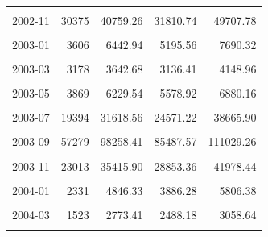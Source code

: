\begin{longtable}[t]{crrrr}
\cellcolor{gray!10}{2002-10} & \cellcolor{gray!10}{46764} & \cellcolor{gray!10}{61256.75} & \cellcolor{gray!10}{58609.47} & \cellcolor{gray!10}{63904.02}\\
2002-11 & 30375 & 40759.26 & 31810.74 & 49707.78\\
\cellcolor{gray!10}{2002-12} & \cellcolor{gray!10}{11649} & \cellcolor{gray!10}{19904.08} & \cellcolor{gray!10}{16540.56} & \cellcolor{gray!10}{23267.60}\\
2003-01 & 3606 & 6442.94 & 5195.56 & 7690.32\\
\cellcolor{gray!10}{2003-02} & \cellcolor{gray!10}{2361} & \cellcolor{gray!10}{3116.51} & \cellcolor{gray!10}{1789.43} & \cellcolor{gray!10}{4443.59}\\
2003-03 & 3178 & 3642.68 & 3136.41 & 4148.96\\
\cellcolor{gray!10}{2003-04} & \cellcolor{gray!10}{1900} & \cellcolor{gray!10}{3649.29} & \cellcolor{gray!10}{3033.63} & \cellcolor{gray!10}{4264.96}\\
2003-05 & 3869 & 6229.54 & 5578.92 & 6880.16\\
\cellcolor{gray!10}{2003-06} & \cellcolor{gray!10}{10549} & \cellcolor{gray!10}{15769.04} & \cellcolor{gray!10}{12007.02} & \cellcolor{gray!10}{19531.06}\\
2003-07 & 19394 & 31618.56 & 24571.22 & 38665.90\\
\cellcolor{gray!10}{2003-08} & \cellcolor{gray!10}{27705} & \cellcolor{gray!10}{71525.80} & \cellcolor{gray!10}{49950.55} & \cellcolor{gray!10}{93101.04}\\
2003-09 & 57279 & 98258.41 & 85487.57 & 111029.26\\
\cellcolor{gray!10}{2003-10} & \cellcolor{gray!10}{43089} & \cellcolor{gray!10}{57666.42} & \cellcolor{gray!10}{55337.61} & \cellcolor{gray!10}{59995.22}\\
2003-11 & 23013 & 35415.90 & 28853.36 & 41978.44\\
\cellcolor{gray!10}{2003-12} & \cellcolor{gray!10}{15069} & \cellcolor{gray!10}{23723.82} & \cellcolor{gray!10}{19426.02} & \cellcolor{gray!10}{28021.62}\\
2004-01 & 2331 & 4846.33 & 3886.28 & 5806.38\\
\cellcolor{gray!10}{2004-02} & \cellcolor{gray!10}{1210} & \cellcolor{gray!10}{2454.76} & \cellcolor{gray!10}{1745.25} & \cellcolor{gray!10}{3164.28}\\
2004-03 & 1523 & 2773.41 & 2488.18 & 3058.64\\
\cellcolor{gray!10}{2004-04} & \cellcolor{gray!10}{1056} & \cellcolor{gray!10}{2703.04} & \cellcolor{gray!10}{2400.49} & \cellcolor{gray!10}{3005.59}\\

\end{longtable}
